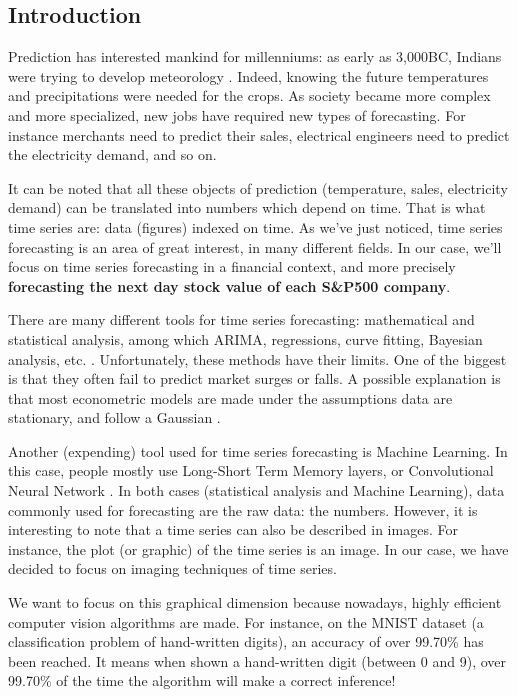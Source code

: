 \documentclass[11pt]{article}
\begin{document}
\begin{onehalfspace}
\pagebreak

\section{Introduction}

Prediction has interested mankind for millenniums: as early as 3,000BC, Indians were trying to develop meteorology \cite{meteo}. Indeed, knowing the future temperatures and precipitations were needed for the crops. As society became more complex and more specialized, new jobs have required new types of forecasting. For instance merchants need to predict their sales, electrical engineers need to predict the electricity demand, and so on. 

It can be noted that all these objects of prediction (temperature, sales, electricity demand) can be translated into numbers which depend on time. That is what time series are: data (figures) indexed on time. As we've just noticed, time series forecasting is an area of great interest, in many different fields. In our case, we'll focus on time series forecasting in a financial context, and more precisely \textbf{forecasting the next day stock value of each S\&P500 company}.

There are many different tools for time series forecasting: mathematical and statistical analysis, among which ARIMA, regressions, curve fitting, Bayesian analysis, etc. \cite{campanharo}. Unfortunately, these methods have their limits. One of the biggest is that they often fail to predict market surges or falls. A possible explanation is that most econometric models are made under the assumptions data are stationary, and follow a Gaussian \cite{arima}. 

Another (expending) tool used for time series forecasting is Machine Learning. In this case, people mostly use Long-Short Term Memory layers, or Convolutional Neural Network \cite{conv_lstm}. In both cases (statistical analysis and Machine Learning), data commonly used for forecasting are the raw data: the numbers. However, it is interesting to note that a time series can also be described in images. For instance, the plot (or graphic) of the time series is an image. In our case, we have decided to focus on imaging techniques of time series.

We want to focus on this graphical dimension because nowadays, highly efficient computer vision algorithms are made. For instance, on the MNIST dataset (a classification problem of hand-written digits), an accuracy of over 99.70\% has been reached. It means when shown a hand-written digit (between 0 and 9), over 99.70\% of the time the algorithm will make a correct inference! 


\end{onehalfspace}
\end{document}
